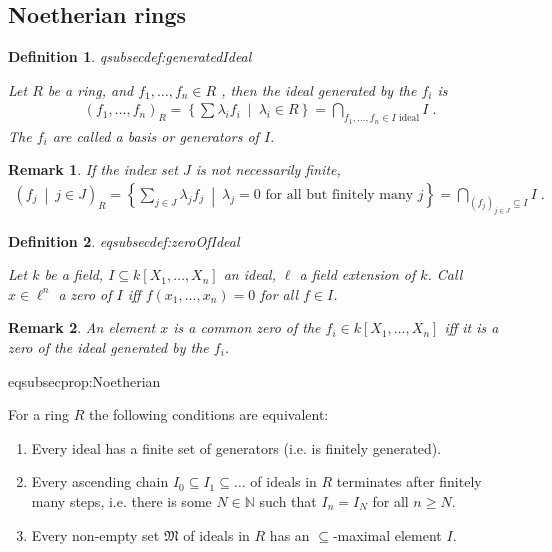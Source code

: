 \documentclass[DIV=14,parskip=full,pointednumbers]{scrartcl}
\newenvironment{alphanumerate}{\begin{enumerate}[label={$(\alph*)$},ref=\curthm]}{\end{enumerate}}
\theoremstyle{cthm}
\theoremstyle{cvarthm}
\theoremstyle{cdef}
\newtheorem{defi}{Definition}[subsection]
\newtheorem{rem}{Remark}[subsection]
\newcommand{\lbl}[1]{
	\label{#1}
	\ifmmode
	\expandafter\xdef\csname eqsubsec#1\endcsname{\thesubsection}
	\fi
}
\newcommand{\IN}{\mathbb{N}}
\newcommand{\st}{\ \middle|\ }
\begin{document}
	\subsection{Noetherian rings}
	\begin{defi}\lbl{def:generatedIdeal}
		Let $R$ be a ring, and $f_1,\ldots, f_n\in R$ , then  the \emph{ideal generated by the $f_i$} is
		\begin{align*}\left( f_1,\ldots,  f_n\right)_R = \left\{\sum\lambda_i f_i\st\lambda_i \in R\right\} = \bigcap_{f_1,\ldots,f_n\in I\text{ ideal}} I\;.
		\end{align*}
		The $f_i$ are called a \emph{basis} or \emph{generators} of $I$. 
	\end{defi}
	\begin{rem}
		If the index set $J$ is not necessarily finite, 
		\begin{align*}
		\left( f_j\st j\in J\right)_R = \left\{\sum_{j\in J} \lambda_j f_j \st\lambda_j = 0 \text{ for all but finitely many } j\right\} = \bigcap_{(f_j)_{j\in J}\subseteq I} I\;.
		\end{align*}
	\end{rem}
	\begin{defi}\lbl{def:zeroOfIdeal}
		Let $k$ be a field, $I\subseteq k[X_1,\ldots, X_n]$ an ideal, $\ell$ a field extension of $k$. Call $x\in \ell^n$ a \emph{zero} of $I$ iff $f(x_1,\ldots,x_n) = 0$ for all $f\in I$. 
	\end{defi}
	\begin{rem}
		An element $x$ is a common zero of the $f_i\in k[X_1,\ldots,X_n]$ iff it is a zero of the ideal generated by the $f_i$.
	\end{rem}
	\begin{prop}\lbl{prop:Noetherian}
		For a ring $R$ the following conditions are equivalent:
		\begin{alphanumerate}
			\item Every ideal has a finite set of generators (i.e. is finitely generated).
			\item Every ascending chain $I_0 \subseteq I_1 \subseteq \ldots$ of ideals in $R$ terminates after finitely many steps, i.e. there is some $N\in\IN$ such that $I_n=I_N$ for all $n\geq N$.
			\item Every non-empty set $\mathfrak{M}$ of ideals in $R$ has an $\subseteq$-maximal element $I$. 
		\end{alphanumerate}
	\end{prop}
	
\end{document}
